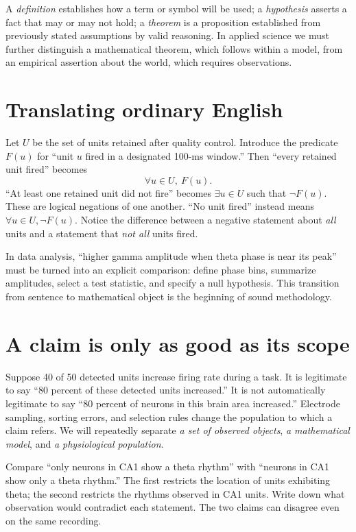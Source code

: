 A \emph{definition} establishes how a term or symbol will be used; a \emph{hypothesis} asserts a fact that may or may not hold; a \emph{theorem} is a proposition established from previously stated assumptions by valid reasoning. In applied science we must further distinguish a mathematical theorem, which follows within a model, from an empirical assertion about the world, which requires observations.

\section{Translating ordinary English}
Let $U$ be the set of units retained after quality control. Introduce the predicate $F(u)$ for ``unit $u$ fired in a designated 100-ms window.'' Then ``every retained unit fired'' becomes
\[ \forall u\in U,\ F(u). \]
``At least one retained unit did not fire'' becomes $\exists u\in U$ such that $\neg F(u)$. These are logical negations of one another. ``No unit fired'' instead means $\forall u\in U,\neg F(u)$. Notice the difference between a negative statement about \emph{all} units and a statement that \emph{not all} units fired.

In data analysis, ``higher gamma amplitude when theta phase is near its peak'' must be turned into an explicit comparison: define phase bins, summarize amplitudes, select a test statistic, and specify a null hypothesis. This transition from sentence to mathematical object is the beginning of sound methodology.

\section{A claim is only as good as its scope}
Suppose 40 of 50 detected units increase firing rate during a task. It is legitimate to say ``80 percent of these detected units increased.'' It is not automatically legitimate to say ``80 percent of neurons in this brain area increased.'' Electrode sampling, sorting errors, and selection rules change the population to which a claim refers. We will repeatedly separate \emph{a set of observed objects}, \emph{a mathematical model}, and \emph{a physiological population}.

\begin{workedexample}
Compare ``only neurons in CA1 show a theta rhythm'' with ``neurons in CA1 show only a theta rhythm.'' The first restricts the location of units exhibiting theta; the second restricts the rhythms observed in CA1 units. Write down what observation would contradict each statement. The two claims can disagree even on the same recording.
\end{workedexample}
